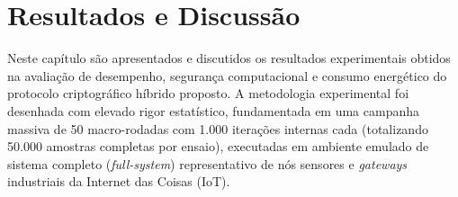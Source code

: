 %

\chapter{Resultados e Discussão}
\label{cap:resultados_discussao}

Neste capítulo são apresentados e discutidos os resultados experimentais obtidos na avaliação de desempenho, segurança computacional e consumo energético do protocolo criptográfico híbrido proposto. A metodologia experimental foi desenhada com elevado rigor estatístico, fundamentada em uma campanha massiva de 50 macro-rodadas com 1.000 iterações internas cada (totalizando 50.000 amostras completas por ensaio), executadas em ambiente emulado de sistema completo (\textit{full-system}) representativo de nós sensores e \textit{gateways} industriais da Internet das Coisas (IoT).

